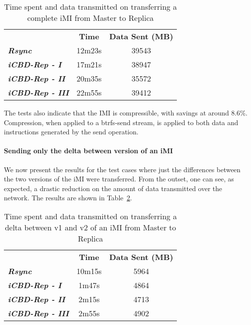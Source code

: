 \begin{table}[h]
\centering
\begin{tabular}{lcc}
 & \textbf{Time} & \textbf{Data Sent (MB)} \\ \cline{2-3} 
\textit{\textbf{Rsync}} & 12m23s & 39543 \\
\textit{\textbf{iCBD-Rep - I}} & 17m21s & 38947 \\
\textit{\textbf{iCBD-Rep - II}} & 20m35s & 35572 \\
\textit{\textbf{iCBD-Rep - III}} & 22m55s & 39412
\end{tabular}
\caption{Time spent and data transmitted on transferring a complete iMI from Master to Replica}
\label{tab:eval_imifull}
\end{table}

The tests also indicate that the IMI is compressible, with savings at around 8.6\%. Compression, when applied to a btrfs-send stream, is applied to both data and instructions generated by the send operation.



\paragraph{Sending only the delta between version of an iMI}
\label{par:eval_iMI_delta}

We now present the results for the test cases where just the differences between the two versions of the iMI were transferred. From the outset, one can see, as expected, a drastic reduction on the amount of data transmitted over the network. The results are shown in Table~\ref{tab:eval_imidelta}.

\begin{table}[h]
\centering
\begin{tabular}{lcc}
 & \textbf{Time} & \textbf{Data Sent (MB)} \\ \cline{2-3} 
\textit{\textbf{Rsync}} & 10m15s & 5964 \\
\textit{\textbf{iCBD-Rep - I}} & 1m47s & 4864 \\
\textit{\textbf{iCBD-Rep - II}} & 2m15s & 4713 \\
\textit{\textbf{iCBD-Rep - III}} & 2m55s & 4902
\end{tabular}
\caption{Time spent and data transmitted on transferring a delta between v1 and v2 of an iMI from Master to Replica}
\label{tab:eval_imidelta}
\end{table}

